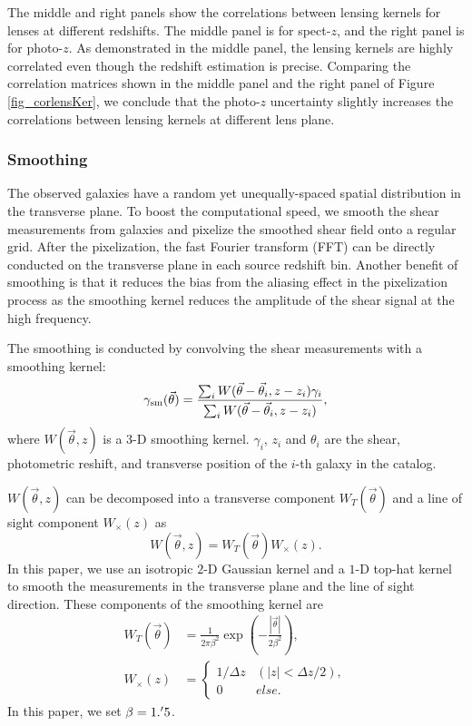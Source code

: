 The middle and right panels show the correlations between lensing kernels for
lenses at different redshifts. The middle panel is for spect-$z$, and the right
panel is for photo-$z$. As demonstrated in the middle panel, the lensing
kernels are highly correlated even though the redshift estimation is precise.
Comparing the correlation matrices shown in the middle panel and the right
panel of Figure \ref{fig_corlensKer}, we conclude that the photo-$z$
uncertainty slightly increases the correlations between lensing kernels at
different lens plane.

\subsubsection{Smoothing}
\label{subsec_method_smoothing}

The observed galaxies have a random yet unequally-spaced spatial distribution
in the transverse plane. To boost the computational speed, we smooth the shear
measurements from galaxies and pixelize the smoothed shear field onto a regular
grid. After the pixelization, the fast Fourier transform (FFT) can be directly
conducted on the transverse plane in each source redshift bin.  Another benefit
of smoothing is that it reduces the bias from the aliasing effect in the
pixelization process as the smoothing kernel reduces the amplitude of the shear
signal at the high frequency.

The smoothing is conducted by convolving the shear measurements with a
smoothing kernel:
\begin{equation}
\gamma_{\rm{sm}} (\vec{\theta})  = \frac{\sum_i
W(\vec{\theta}-\vec{{\theta}}_i,z-z_i) \gamma_i}{\sum_i
W(\vec{\theta}-\vec{{\theta}}_i,z-z_i) },
\end{equation}
where $W(\vec{\theta},z)$ is a $3$-D smoothing kernel. $\gamma_i$, $z_i$ and
$\theta_i$ are the shear, photometric reshift, and transverse position of the
$i$-th galaxy in the catalog.

$W(\vec{\theta},z)$ can be decomposed into a transverse component
$W_T(\vec{\theta})$ and a line of sight component
$W_\times(z)$ as
\begin{equation}
W(\vec{\theta},z)=W_T(\vec{\theta}) W_\times (z).
\end{equation}
In this paper, we use an isotropic $2$-D Gaussian kernel and a $1$-D top-hat
kernel to smooth the measurements in the transverse plane and the line of sight
direction. These components of the smoothing kernel are
\begin{equation}
\begin{split}
W_T(\vec{\theta}) &=\frac{1}{2\pi\beta^2}\exp(-\frac{|\vec{\theta}|}{2\beta^2}),\\
W_\times (z) &=
\begin{cases}
1/\Delta z& (|z|<\Delta z/2),\\
0& else.
\end{cases}
\end{split}
\end{equation}
In this paper, we set $\beta=1.\mbox{$^\prime$}5$.

